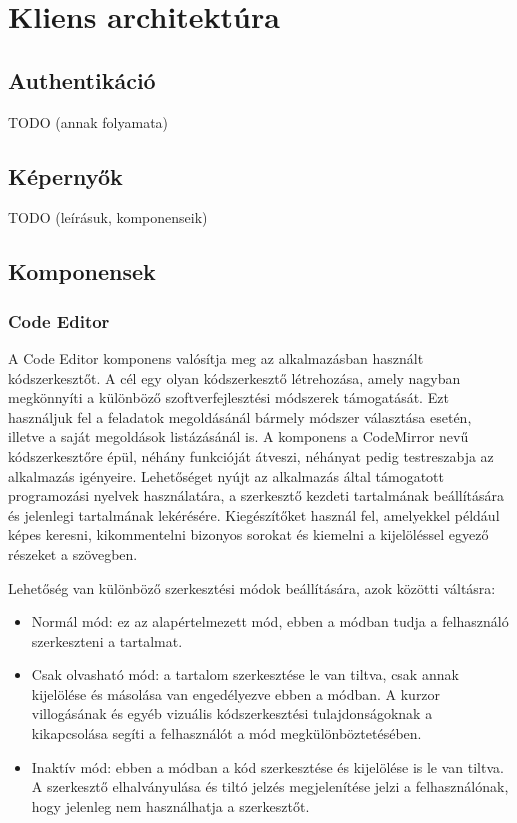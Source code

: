 \documentclass{elteikthesis}
\begin{document}
		\section{Kliens architektúra}

			\subsection{Authentikáció}
			TODO (annak folyamata)
			
			\subsection{Képernyők}
			TODO (leírásuk, komponenseik)
			
			\subsection{Komponensek}
				\subsubsection{Code Editor}
				A Code Editor komponens valósítja meg az alkalmazásban használt kódszerkesztőt. A cél egy olyan kódszerkesztő létrehozása, amely nagyban megkönnyíti a különböző szoftverfejlesztési módszerek támogatását. Ezt használjuk fel a feladatok megoldásánál bármely módszer választása esetén, illetve a saját megoldások listázásánál is. A komponens a CodeMirror nevű kódszerkesztőre épül, néhány funkcióját átveszi, néhányat pedig testreszabja az alkalmazás igényeire. Lehetőséget nyújt az alkalmazás által támogatott programozási nyelvek használatára, a szerkesztő kezdeti tartalmának beállítására és jelenlegi tartalmának lekérésére. Kiegészítőket használ fel, amelyekkel például képes keresni, kikommentelni bizonyos sorokat és kiemelni a kijelöléssel egyező részeket a szövegben.
				
				Lehetőség van különböző szerkesztési módok beállítására, azok közötti váltásra:
				\begin{itemize}
					\item Normál mód: ez az alapértelmezett mód, ebben a módban tudja a felhasználó szerkeszteni a tartalmat.
					\item Csak olvasható mód: a tartalom szerkesztése le van tiltva, csak annak kijelölése és másolása van engedélyezve ebben a módban. A kurzor villogásának és egyéb vizuális kódszerkesztési tulajdonságoknak a kikapcsolása segíti a felhasználót a mód megkülönböztetésében.
					\item Inaktív mód: ebben a módban a kód szerkesztése és kijelölése is le van tiltva. A szerkesztő elhalványulása és tiltó jelzés megjelenítése jelzi a felhasználónak, hogy jelenleg nem használhatja a szerkesztőt.
				\end{itemize}
\end{document}
